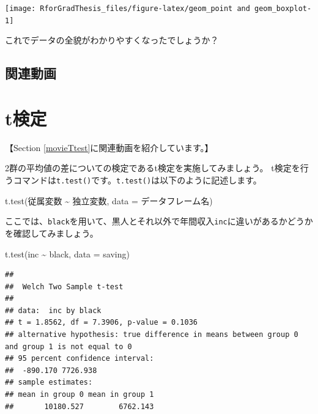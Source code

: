 \documentclass[
]{book}
\newenvironment{Shaded}{\begin{snugshade}}{\end{snugshade}}
\newcommand{\AttributeTok}[1]{\textcolor[rgb]{0.77,0.63,0.00}{#1}}
\newcommand{\FunctionTok}[1]{\textcolor[rgb]{0.00,0.00,0.00}{#1}}
\newcommand{\NormalTok}[1]{#1}
\newcommand{\SpecialCharTok}[1]{\textcolor[rgb]{0.00,0.00,0.00}{#1}}
\begin{document}
\begin{center}\texttt{[image: RforGradThesis\_files/figure-latex/geom\_point and geom\_boxplot-1]} \end{center}

これでデータの全貌がわかりやすくなったでしょうか？

\hypertarget{movieVisualization}{%
\section{関連動画}\label{movieVisualization}}

\hypertarget{Ttest}{%
\chapter{t検定}\label{Ttest}}

【Section \ref{movieTtest}に関連動画を紹介しています。】

2群の平均値の差についての検定であるt検定を実施してみましょう。
t検定を行うコマンドは\texttt{t.test()}です。\texttt{t.test()}は以下のように記述します。

\begin{Shaded}
\begin{Highlighting}[]
\FunctionTok{t.test}\NormalTok{(従属変数 }\SpecialCharTok{\textasciitilde{}}\NormalTok{ 独立変数, }\AttributeTok{data =}\NormalTok{ データフレーム名)}
\end{Highlighting}
\end{Shaded}

ここでは、\texttt{black}を用いて、黒人とそれ以外で年間収入\texttt{inc}に違いがあるかどうかを確認してみましょう。

\begin{Shaded}
\begin{Highlighting}[]
\FunctionTok{t.test}\NormalTok{(inc }\SpecialCharTok{\textasciitilde{}}\NormalTok{ black, }\AttributeTok{data =}\NormalTok{ saving)}
\end{Highlighting}
\end{Shaded}

\begin{verbatim}
## 
##  Welch Two Sample t-test
## 
## data:  inc by black
## t = 1.8562, df = 7.3906, p-value = 0.1036
## alternative hypothesis: true difference in means between group 0 and group 1 is not equal to 0
## 95 percent confidence interval:
##  -890.170 7726.938
## sample estimates:
## mean in group 0 mean in group 1 
##       10180.527        6762.143
\end{verbatim}
\end{document}
